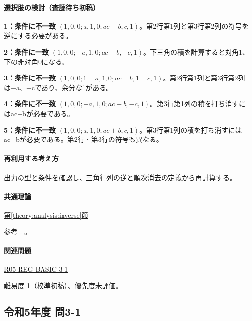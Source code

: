\paragraph{選択肢の検討（査読待ち初稿）}\mbox{}\par

\noindent\textbf{1：条件に不一致} \((1,0,0;a,1,0;ac-b,c,1)\)。第2行第1列と第3行第2列の符号を逆にする必要がある。\par

\noindent\textbf{2：条件に一致} \((1,0,0;-a,1,0;ac-b,-c,1)\)。下三角の積を計算すると対角1、下の非対角0になる。\par

\noindent\textbf{3：条件に不一致} \((1,0,0;1-a,1,0;ac-b,1-c,1)\)。第2行第1列と第3行第2列は−a、−cであり、余分な1がある。\par

\noindent\textbf{4：条件に不一致} \((1,0,0;-a,1,0;ac+b,-c,1)\)。第3行第1列の積を打ち消すにはac−bが必要である。\par

\noindent\textbf{5：条件に不一致} \((1,0,0;a,1,0;ac+b,c,1)\)。第3行第1列の積を打ち消すにはac−bが必要である。第2行・第3行の符号も異なる。\par

\paragraph{再利用する考え方} 出力の型と条件を確認し、三角行列の逆と順次消去の定義から再計算する。

\paragraph{共通理論} \hyperref[theory:analysis:inverse]{第\ref*{theory:analysis:inverse}節}

\par 参考：\cite{mit_inverse2007}。

\paragraph{関連問題} \hyperref[q:r05-reg-basic-3-1]{R05-REG-BASIC-3-1}

\par 難易度 1（校準初稿）、優先度未評価。

\subsection{令和5年度 問3-1}
\label{q:r05-reg-basic-3-1}

